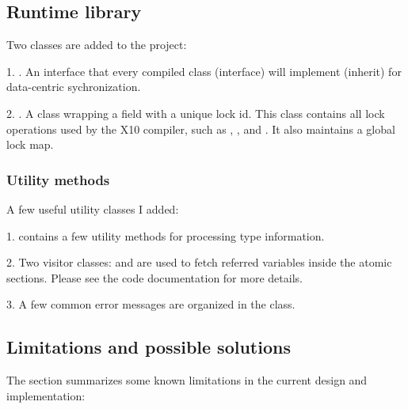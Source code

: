 \documentclass{article}
\begin{document}
\subsection{Runtime library}
\label{sec:runtime}

Two classes are added to the  project:

1. . An interface that every compiled class (interface) will implement (inherit) for data-centric sychronization.

2. . A class wrapping a  field with a unique lock id. This class contains all lock operations used by the X10 compiler, such as , , and . It also maintains a global lock map.

\subsubsection{Utility methods}

A few useful utility classes I added:

1.  contains a few utility methods for processing type information.

2. Two visitor classes:  and
 are used to fetch referred variables inside the atomic sections. Please see the code documentation for more details.

3. A few common error messages are organized in the  class.

\subsection{Limitations and possible solutions}
\label{sec:limitation}

The section summarizes some  known limitations in the current design and implementation:
\end{document}
